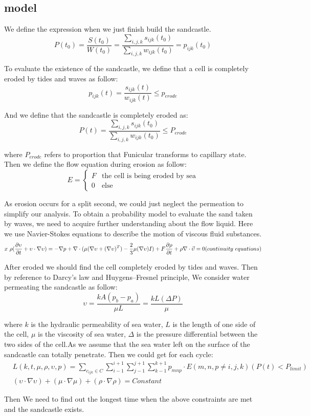 \documentclass[12pt]{article}
\begin{document}
\subsection{model}
We define the expression when we just finish build the sandcastle.
$$  P(t_0) = \frac{S(t_0)}{W(t_0)} = \frac{\sum_{i,j,k}s_{ijk}(t_0)}{\sum_{i,j,k}w_{ijk}(t_0)} = p_{ijk}(t_0) $$
\par
To evaluate the existence of the sandcastle, we define that a cell is completely eroded by tides and waves as follow:
$$  p_{ijk}(t) = \frac{s_{ijk}(t)}{w_{ijk}(t)} \leq p_{erode} $$
\par
And we define that the sandcastle is completely eroded as:
$$  P(t) = \frac{\sum_{i,j,k}s_{ijk}(t_0)}{\sum_{i,j,k}w_{ijk}(t_0)} \leq P_{erode} $$
\par
where $P_{erode}$ refers to proportion that Funicular transforms to capillary state. Then we define the flow equation during erosion as follow:
$$	E=
    \begin{cases}
        F & \text{the cell is being eroded by sea} \\
        0 & \text{else}
    \end{cases}
$$
\par
As erosion occurs for a split second, we could just neglect the permeation to simplify our analysis. To obtain a probability model to evaluate the sand taken by waves, we need to acquire further understanding about the flow liquid. Here we use Navier-Stokes equations to describe the motion of viscous fluid substances.
$$
    x \rho(\frac{\partial \upsilon}{\partial t} + \upsilon \cdot \nabla \upsilon) = -\nabla p + \nabla \cdot(\mu(\nabla \upsilon+(\nabla \upsilon)^T)-\frac{2}{3}\mu(\nabla \upsilon)I)+F\\\frac{\partial \rho}{\partial t}+\rho\nabla\cdot\vec{\upsilon}=0(continuity \ equations)
$$
\par
After eroded we should find the cell completely eroded by tides and waves. Then by reference to Darcy's law and Huygens–Fresnel principle, We consider water permeating the sandcastle as follow:
$$
    \upsilon=\frac{kA(p_b-p_a)}{\mu L}=\frac{kL(\Delta P)}{\mu}
$$
\par
where $k$ is the hydraulic permeability of sea water, $L$ is the length of one side of the cell, $\mu$ is the viscosity of sea water, $\Delta$ is the pressure differential between the two sides of the cell.As we assume that the sea water left on the surface of the sandcastle can totally penetrate. Then we could get for each cycle:
\begin{align*}
     & L (k,t,\mu,\rho,\upsilon,p)=\sum_{c_{ijk}\in C}\sum_{i-1}^{i+1}\sum_{j-1}^{j+1}\sum_{k-1}^{k+1}{p_{mnp}\cdot E}(m,n,p \neq i,j,k)(P(t) <P_{limit}) \\
     & (\upsilon \cdot \nabla \upsilon)+(\mu \cdot \nabla \mu)+(\rho \cdot \nabla \rho) = Constant
\end{align*}
\par
Then We need to find out the longest time when the above constraints are met and the sandcastle exists.
\end{document}
